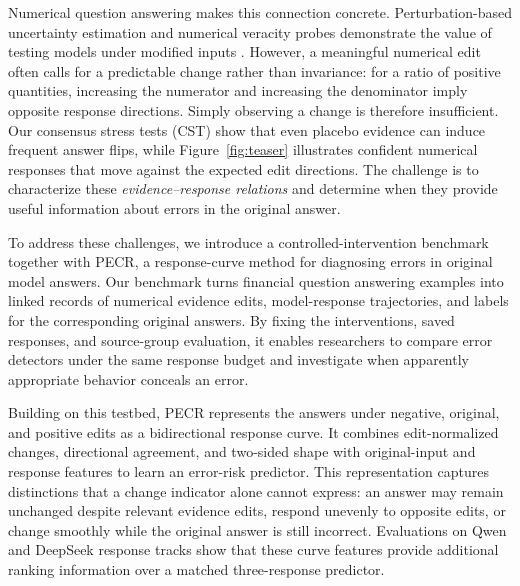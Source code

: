 \documentclass[11pt]{article}
\begin{document}
Numerical question answering makes this connection concrete. Perturbation-based uncertainty estimation and numerical veracity probes demonstrate the value of testing models under modified inputs \citep{gao-etal-2024-spuq,aarnes-setty-2025-numpert}. However, a meaningful numerical edit often calls for a predictable change rather than invariance: for a ratio of
positive quantities, increasing the numerator and increasing the denominator imply opposite response directions. Simply observing a change is therefore insufficient. Our consensus stress tests (CST) show that even placebo evidence can induce frequent answer flips, while Figure~\ref{fig:teaser} illustrates confident numerical responses that move against the expected edit directions. The challenge is to characterize these \emph{evidence--response relations} and determine when they provide useful information about errors in the original answer.

To address these challenges, we introduce a controlled-intervention benchmark together with PECR, a response-curve method for diagnosing errors in original model answers. Our benchmark turns financial question answering examples into linked records of numerical evidence edits, model-response trajectories, and labels for the corresponding original answers. By fixing the interventions, saved responses, and source-group evaluation, it enables researchers to compare error detectors under the same response budget and investigate when apparently appropriate behavior conceals an error.

Building on this testbed, PECR represents the answers under negative, original, and positive edits as a bidirectional response curve. It combines edit-normalized changes, directional agreement, and two-sided shape with original-input and response features to learn an error-risk predictor. This representation captures distinctions that a change indicator alone cannot express: an answer may remain unchanged despite relevant evidence edits, respond unevenly to opposite edits, or change smoothly while the original answer is still incorrect. Evaluations on Qwen and DeepSeek response tracks show that these curve features provide additional ranking information over a matched three-response predictor.
\end{document}
